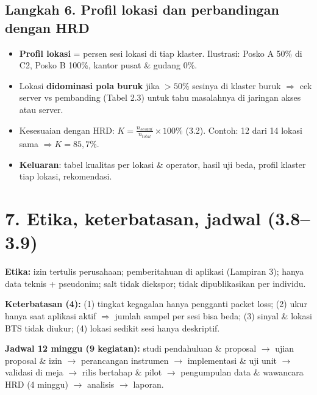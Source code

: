 \subsection*{Langkah 6. Profil lokasi dan perbandingan dengan HRD}
\begin{itemize}
  \item \textbf{Profil lokasi} = persen sesi lokasi di tiap klaster. Ilustrasi: Posko A 50\% di C2, Posko B 100\%, kantor pusat \& gudang 0\%.
  \item Lokasi \textbf{didominasi pola buruk} jika $>50\%$ sesinya di klaster buruk $\Rightarrow$ cek server vs pembanding (Tabel 2.3) untuk tahu masalahnya di jaringan akses atau server.
  \item Kesesuaian dengan HRD: $K=\frac{n_{sesuai}}{n_{total}}\times100\%$ (3.2). Contoh: 12 dari 14 lokasi sama $\Rightarrow K=85{,}7\%$.
  \item \textbf{Keluaran}: tabel kualitas per lokasi \& operator, hasil uji beda, profil klaster tiap lokasi, rekomendasi.
\end{itemize}

\section*{7. Etika, keterbatasan, jadwal (3.8--3.9)}
\textbf{Etika:} izin tertulis perusahaan; pemberitahuan di aplikasi (Lampiran 3); hanya data teknis + pseudonim; salt tidak diekspor; tidak dipublikasikan per individu.

\textbf{Keterbatasan (4):} (1) tingkat kegagalan hanya pengganti packet loss; (2) ukur hanya saat aplikasi aktif $\Rightarrow$ jumlah sampel per sesi bisa beda; (3) sinyal \& lokasi BTS tidak diukur; (4) lokasi sedikit sesi hanya deskriptif.

\textbf{Jadwal 12 minggu (9 kegiatan):} studi pendahuluan \& proposal $\rightarrow$ ujian proposal \& izin $\rightarrow$ perancangan instrumen $\rightarrow$ implementasi \& uji unit $\rightarrow$ validasi di meja $\rightarrow$ rilis bertahap \& pilot $\rightarrow$ pengumpulan data \& wawancara HRD (4 minggu) $\rightarrow$ analisis $\rightarrow$ laporan.


